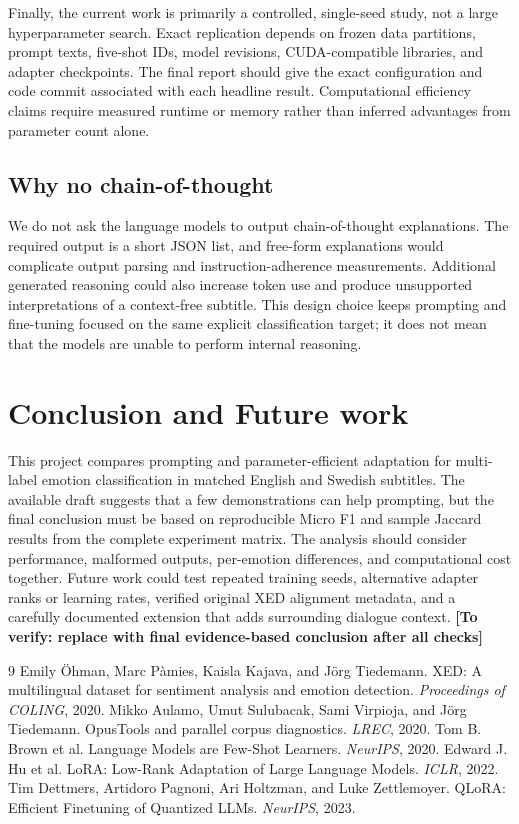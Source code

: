 \documentclass[11pt,a4paper]{article}
\newcommand{\todo}[1]{\textcolor{red!65!black}{\textbf{[To verify: #1]}}}
\begin{document}
Finally, the current work is primarily a controlled, single-seed study, not a large hyperparameter search. Exact replication depends on frozen data partitions, prompt texts, five-shot IDs, model revisions, CUDA-compatible libraries, and adapter checkpoints. The final report should give the exact configuration and code commit associated with each headline result. Computational efficiency claims require measured runtime or memory rather than inferred advantages from parameter count alone.

\subsection{Why no chain-of-thought}
We do not ask the language models to output chain-of-thought explanations. The required output is a short JSON list, and free-form explanations would complicate output parsing and instruction-adherence measurements. Additional generated reasoning could also increase token use and produce unsupported interpretations of a context-free subtitle. This design choice keeps prompting and fine-tuning focused on the same explicit classification target; it does not mean that the models are unable to perform internal reasoning.

\section{Conclusion and Future work}
This project compares prompting and parameter-efficient adaptation for multi-label emotion classification in matched English and Swedish subtitles. The available draft suggests that a few demonstrations can help prompting, but the final conclusion must be based on reproducible Micro F1 and sample Jaccard results from the complete experiment matrix. The analysis should consider performance, malformed outputs, per-emotion differences, and computational cost together. Future work could test repeated training seeds, alternative adapter ranks or learning rates, verified original XED alignment metadata, and a carefully documented extension that adds surrounding dialogue context. \todo{replace with final evidence-based conclusion after all checks}

\begin{thebibliography}{9}
 Emily \"Ohman, Marc P\`amies, Kaisla Kajava, and J\"org Tiedemann. XED: A multilingual dataset for sentiment analysis and emotion detection. \emph{Proceedings of COLING}, 2020.
 Mikko Aulamo, Umut Sulubacak, Sami Virpioja, and J\"org Tiedemann. OpusTools and parallel corpus diagnostics. \emph{LREC}, 2020.
 Tom B. Brown et al. Language Models are Few-Shot Learners. \emph{NeurIPS}, 2020.
 Edward J. Hu et al. LoRA: Low-Rank Adaptation of Large Language Models. \emph{ICLR}, 2022.
 Tim Dettmers, Artidoro Pagnoni, Ari Holtzman, and Luke Zettlemoyer. QLoRA: Efficient Finetuning of Quantized LLMs. \emph{NeurIPS}, 2023.
\end{thebibliography}
\end{document}
